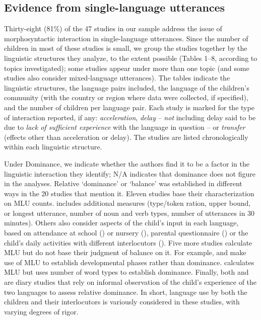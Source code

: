 \documentclass[output=paper]{langscibook}
\begin{document}
\subsection{Evidence from single-language utterances} \label{sec:vihmannvihmann:3.1}

Thirty-eight (81\%) of the 47 studies in our sample address the issue of morphosyntactic interaction in single-language utterances. Since the number of children in most of these studies is small, we group the studies together by the linguistic structures they analyze, to the extent possible (Tables 1–8, according to topics investigated); some studies appear under more than one topic (and some studies also consider mixed-language utterances). The tables indicate the linguistic structures, the language pairs included, the language of the children’s community (with the country or region where data were collected, if specified), and the number of children per language pair. Each study is marked for the type of interaction reported, if any: \textit{acceleration}, \textit{delay} – \textit{not} including delay said to be due to \textit{lack of sufficient experience} with the language in question – or \textit{transfer} (effects other than acceleration or delay). The studies are listed chronologically within each linguistic structure. 

Under Dominance, we indicate whether the authors find it to be a factor in the linguistic interaction they identify; N/A indicates that dominance does not figure in the analyses. Relative ‘dominance’ or ‘balance’ was established in different ways in the 20 studies that mention it. Eleven studies base their characterization on MLU counts. \citet{Kupisch2007} includes additional measures (type/token ration, upper bound, or longest utterance, number of noun and verb types, number of utterances in 30 minutes). Others also consider aspects of the child’s input in each language, based on attendance at school (\citealt{Austin2009}) or nursery (\citealt{Blom2010}), parental questionnaire (\citealt{FernándezFuertesLiceras2010,LicerasEtAl2012}) or the child’s daily activities with different interlocutors (\citealt{QidiBiase2020}). Five more studies calculate MLU but do not base their judgment of balance on it. For example, \citet{Dopke1998,Döpke2000} and \citet{HulkMüller2000} make use of MLU to establish developmental phases rather than dominance. \citet{Mishina-Mori2020} calculates MLU but uses number of word types to establish dominance. Finally, both \citet{AdnyaniEtAl2018} and \citet{Silva-corvalan2008} are diary studies that rely on informal observation of the child’s experience of the two languages to assess relative dominance. In short, language use by both the children and their interlocutors is variously considered in these studies, with varying degrees of rigor.
\end{document}
